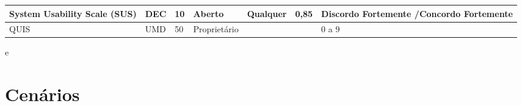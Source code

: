 \begin{table}[h]
\begin{tabular}{|p{3cm}|l|l|l|p{3cm}|l|l|}
System Usability Scale (SUS)                                                                 & DEC              & 10       & Aberto          & Qualquer              & 0,85           & Discordo Fortemente /Concordo Fortemente                                            \\ \hline
QUIS                                                                                         & UMD              & 50       & Proprietário    &                       &                & 0 a 9                                                                               \\ \hline
\end{tabular}
\end{table}
e
 
\section{Cenários}


